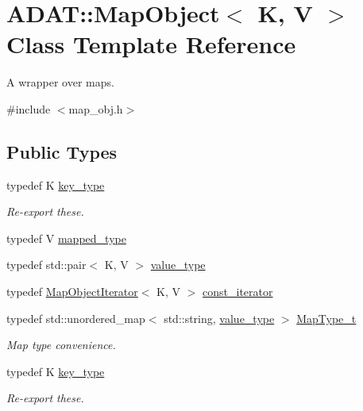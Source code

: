 \hypertarget{classADAT_1_1MapObject}{}\section{A\+D\+AT\+:\+:Map\+Object$<$ K, V $>$ Class Template Reference}
\label{classADAT_1_1MapObject}


A wrapper over maps.  




{\ttfamily \#include $<$map\+\_\+obj.\+h$>$}

\subsection*{Public Types}
\begin{DoxyCompactItemize}
\item 
typedef K \mbox{\hyperlink{classADAT_1_1MapObject_a98d458cd1ecd1265ae5451619de933db}{key\+\_\+type}}
\begin{DoxyCompactList}\small\item\em Re-\/export these. \end{DoxyCompactList}\item 
typedef V \mbox{\hyperlink{classADAT_1_1MapObject_ad307fa02da187571a964db1e195a3caa}{mapped\+\_\+type}}
\item 
typedef std\+::pair$<$ K, V $>$ \mbox{\hyperlink{classADAT_1_1MapObject_ad985e6ff5b35a72c79d4b466d316cc0a}{value\+\_\+type}}
\item 
typedef \mbox{\hyperlink{classADAT_1_1MapObjectIterator}{Map\+Object\+Iterator}}$<$ K, V $>$ \mbox{\hyperlink{classADAT_1_1MapObject_a4622cd7d3b6fed18fe226d28091cc6c8}{const\+\_\+iterator}}
\item 
typedef std\+::unordered\+\_\+map$<$ std\+::string, \mbox{\hyperlink{classADAT_1_1MapObject_ad985e6ff5b35a72c79d4b466d316cc0a}{value\+\_\+type}} $>$ \mbox{\hyperlink{classADAT_1_1MapObject_ad6a4952087d3de5a43d08b2ea2ad270b}{Map\+Type\+\_\+t}}
\begin{DoxyCompactList}\small\item\em Map type convenience. \end{DoxyCompactList}\item 
typedef K \mbox{\hyperlink{classADAT_1_1MapObject_a98d458cd1ecd1265ae5451619de933db}{key\+\_\+type}}
\begin{DoxyCompactList}\small\item\em Re-\/export these. \end{DoxyCompactList}\item 

\end{DoxyCompactItemize}
